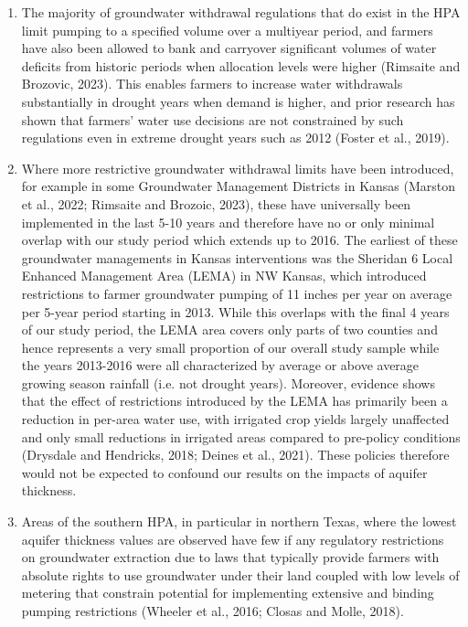 \documentclass[
]{article}
\begin{document}
\begin{itemize}
\begin{itemize}
{  \begin{enumerate}
      \item The majority of groundwater withdrawal regulations that do exist in the HPA limit pumping to a specified volume over a multiyear period, and farmers have also been allowed to bank and carryover significant volumes of water deficits from historic periods when allocation levels were higher (Rimsaite and Brozovic, 2023). This enables farmers to increase water withdrawals substantially in drought years when demand is higher, and prior research has shown that farmers' water use decisions are not constrained by such regulations even in extreme drought years such as 2012 (Foster et al., 2019).
      \item Where more restrictive groundwater withdrawal limits have been introduced, for example in some Groundwater Management Districts in Kansas (Marston et al., 2022; Rimsaite and Brozoic, 2023), these have universally been implemented in the last 5-10 years and therefore have no or only minimal overlap with our study period which extends up to 2016. The earliest of these groundwater managements in Kansas interventions was the Sheridan 6 Local Enhanced Management Area (LEMA) in NW Kansas, which introduced restrictions to farmer groundwater pumping of 11 inches per year on average per 5-year period starting in 2013. While this overlaps with the final 4 years of our study period, the LEMA area covers only parts of two counties and hence represents a very small proportion of our overall study sample while the years 2013-2016 were all characterized by average or above average growing season rainfall (i.e. not drought years). Moreover, evidence shows that the effect of restrictions introduced by the LEMA has primarily been a reduction in per-area water use, with irrigated crop yields largely unaffected and only small reductions in irrigated areas compared to pre-policy conditions (Drysdale and Hendricks, 2018; Deines et al., 2021). These policies therefore would not be expected to confound our results on the impacts of aquifer thickness. 
      \item Areas of the southern HPA, in particular in northern Texas, where the lowest aquifer thickness values are observed have few if any regulatory restrictions on groundwater extraction due to laws that typically provide farmers with absolute rights to use groundwater under their land coupled with low levels of metering that constrain potential for implementing extensive and binding pumping restrictions (Wheeler et al., 2016; Closas and Molle, 2018). 
  \end{enumerate}
  }


\end{itemize}
\end{itemize}
\end{document}
